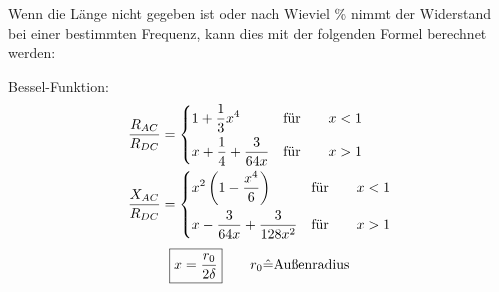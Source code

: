 Wenn die Länge nicht gegeben ist oder nach Wieviel \% nimmt der Widerstand bei
einer bestimmten Frequenz, kann dies mit der folgenden Formel berechnet werden:

\begin{description}
    \item Bessel-Funktion:
        \begin{align*}
            \frac{R_{AC}}{R_{DC}} & =
            \begin{dcases}
                1 + \frac{1}{3}x^4              & \text{für} \qquad x < 1 \\
                x + \frac{1}{4} + \frac{3}{64x} & \text{für} \qquad x > 1 \\
            \end{dcases} \\
            \frac{X_{AC}}{R_{DC}} & =
            \begin{dcases}
                x^2\left( 1-\frac{x^4}{6} \right)   & \text{für} \qquad x < 1 \\
                x- \frac{3}{64x} + \frac{3}{128x^2} & \text{für} \qquad x > 1 \\
            \end{dcases}
        \end{align*}
        \[
            \boxed{x=\frac{r_0}{2\delta}} \qquad r_0 \hat{=} \textnormal{Außenradius}
        \]
\end{description}